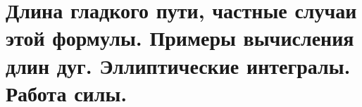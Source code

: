 \documentclass[../main.tex]{subfiles}
\begin{document}
\newpage
\section{Длина гладкого пути, частные случаи этой формулы. Примеры вычисления длин дуг. Эллиптические интегралы. Работа силы.}
\end{document}
